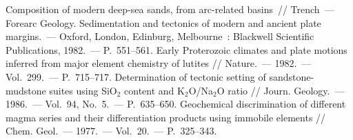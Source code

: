 \begin{thebibliography}{99}
\bibitem{} Composition of modern deep-sea sands, from arc-related basins~// Trench~--- Forearc Geology. Sedimentation and tectonics of modern and ancient plate margins.~--- Oxford, London, Edinburg, Melbourne~: Blackwell Scientific Publications, 1982.~--- P.~551--561.
\bibitem{} Early Proterozoic climates and plate motions inferred from major element chemistry of lutites // Nature.~--- 1982.~--- Vol.~299.~--- P.~715--717.
\bibitem{} Determination of tectonic setting of sandstone-mudstone suites using SiO$_2$ content and K$_2$O/Na$_2$O ratio // Journ. Geology.~--- 1986.~--- Vol.~94, No.~5.~--- P.~635--650.
\bibitem{} Geochemical discrimination of different magma series and their differentiation products using immobile elements // Chem. Geol.~--- 1977.~--- Vol.~20.~--- P.~325--343.

\end{thebibliography}
\thispagestyle{empty}
